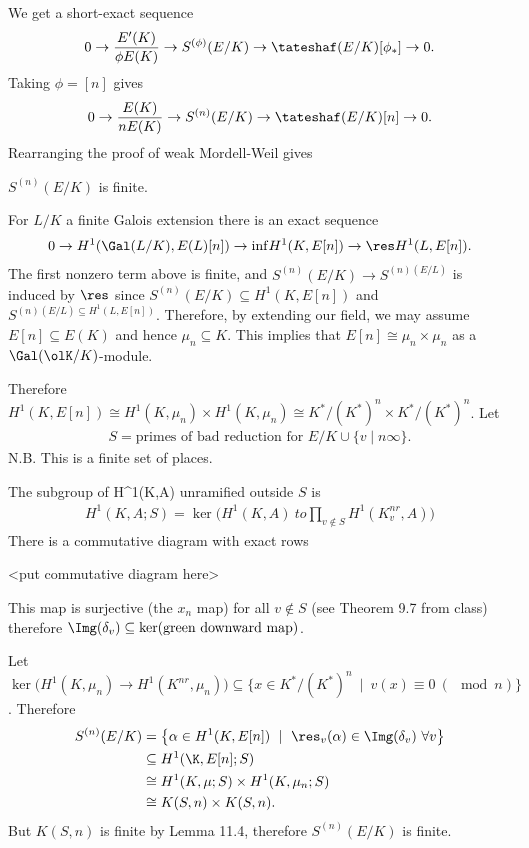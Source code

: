 We get a short-exact sequence
\begin{align*}
	0 \to \frac{E'(K)}{\phi E(K)} \to S^{(\phi)}(E/K) \to \tateshaf(E/K)[\phi_*] \to 0.
\end{align*}
Taking $\phi = [n]$ gives
\begin{align*}
	0 \to \frac{E(K)}{nE(K)}\to S^{(n)}(E/K) \to \tateshaf(E/K)[n] \to 0.
\end{align*}
Rearranging the proof of weak Mordell-Weil gives
\begin{thm}\label{thm:S-is-finite}
	$S^{(n)}(E/K)$ is finite.
\end{thm}
\begin{prf}
	For $L/K$ a finite Galois extension there is an exact sequence
	\begin{align*}
		0 \to H^1(\Gal(L/K), E(L)[n]) \to{\inf} H^1(K,E[n]) \to{\res} H^1(L,E[n]).
	\end{align*}
	The first nonzero term above is finite, and $S^{(n)}(E/K) \to S^{(n)(E/L)}$ is induced by $\res$ since $S^{(n)}(E/K) \subseteq H^1(K,E[n])$ and $S^{(n)(E/L) \subseteq H^1(L,E[n])}$. Therefore, by extending our field, we may assume $E[n] \subseteq E(K)$ and hence $\mu_n \subseteq K$. This implies that $E[n] \cong \mu_n \times \mu_n$ as a $\Gal(\olK/K)$-module.

	Therefore $H^1(K,E[n]) \cong H^1(K,\mu_n) \times H^1(K,\mu_n)\cong K^*/(K^*)^n \times K^*/(K^*)^n$. Let
	\begin{align*}
		S = \text{primes of bad reduction for $E/K$} \cup \{v \mid n \infty\}.
	\end{align*}
	N.B. This is a finite set of places.
\end{prf}

\begin{defn}\label{defn:unramifiedoutsideS}
	The subgroup of H^1(K,A) unramified outside $S$ is
	\begin{align*}
		H^1(K,A;S) = \ker\big(H^1(K,A)\ to \prod_{v\not\in S} H^1(K_v^{nr},A)\big)
	\end{align*}
	There is a commutative diagram with exact rows 
	\begin{center}
		<put commutative diagram here>
	\end{center}
	This map is surjective (the $x_n$ map) for all $v \not\in S$ (see Theorem 9.7 from class) therefore $\Img(\delta_v) \subseteq \ker(\text{green downward map})$.
\end{defn}
\begin{lem}
	Let $\ker\big(H^1(K,\mu_n) \to H^1(K^{nr},\mu_n)\big) \subseteq \{x \in K^*/(K^*)^n ~ \mid ~ v(x) \equiv 0 ~ (\mod n)\}$.
	Therefore
	\begin{align*}
		S^{(n)}(E/K) &= \left\{\alpha \in H^1(K, E[n]) ~\mid ~ \res_v(\alpha) \in \Img(\delta_v) ~ \forall v\right\} \\
					 &\subseteq H^1(\K,E[n]; S) \\
					 &\cong H^1(K,\mu; S) \times H^1(K,\mu_n ; S) \\
					 &\cong K(S,n)\times K(S,n).
	\end{align*}
	But $K(S,n)$ is finite by Lemma 11.4, therefore $S^{(n)}(E/K)$ is finite.
\end{lem}

